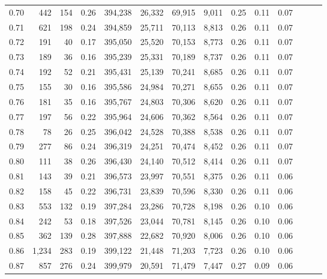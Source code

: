 \begin{tabular}{rrrrrrrrrrrrrr}
0.70 &     442 &    154 &  0.26 &  394,238 &   26,332 &  69,915 &   9,011 &  0.25 &  0.11 &      0.07 \\
0.71 &     621 &    198 &  0.24 &  394,859 &   25,711 &  70,113 &   8,813 &  0.26 &  0.11 &      0.07 \\
0.72 &     191 &     40 &  0.17 &  395,050 &   25,520 &  70,153 &   8,773 &  0.26 &  0.11 &      0.07 \\
0.73 &     189 &     36 &  0.16 &  395,239 &   25,331 &  70,189 &   8,737 &  0.26 &  0.11 &      0.07 \\
0.74 &     192 &     52 &  0.21 &  395,431 &   25,139 &  70,241 &   8,685 &  0.26 &  0.11 &      0.07 \\
0.75 &     155 &     30 &  0.16 &  395,586 &   24,984 &  70,271 &   8,655 &  0.26 &  0.11 &      0.07 \\
0.76 &     181 &     35 &  0.16 &  395,767 &   24,803 &  70,306 &   8,620 &  0.26 &  0.11 &      0.07 \\
0.77 &     197 &     56 &  0.22 &  395,964 &   24,606 &  70,362 &   8,564 &  0.26 &  0.11 &      0.07 \\
0.78 &      78 &     26 &  0.25 &  396,042 &   24,528 &  70,388 &   8,538 &  0.26 &  0.11 &      0.07 \\
0.79 &     277 &     86 &  0.24 &  396,319 &   24,251 &  70,474 &   8,452 &  0.26 &  0.11 &      0.07 \\
0.80 &     111 &     38 &  0.26 &  396,430 &   24,140 &  70,512 &   8,414 &  0.26 &  0.11 &      0.07 \\
0.81 &     143 &     39 &  0.21 &  396,573 &   23,997 &  70,551 &   8,375 &  0.26 &  0.11 &      0.06 \\
0.82 &     158 &     45 &  0.22 &  396,731 &   23,839 &  70,596 &   8,330 &  0.26 &  0.11 &      0.06 \\
0.83 &     553 &    132 &  0.19 &  397,284 &   23,286 &  70,728 &   8,198 &  0.26 &  0.10 &      0.06 \\
0.84 &     242 &     53 &  0.18 &  397,526 &   23,044 &  70,781 &   8,145 &  0.26 &  0.10 &      0.06 \\
0.85 &     362 &    139 &  0.28 &  397,888 &   22,682 &  70,920 &   8,006 &  0.26 &  0.10 &      0.06 \\
0.86 &   1,234 &    283 &  0.19 &  399,122 &   21,448 &  71,203 &   7,723 &  0.26 &  0.10 &      0.06 \\
0.87 &     857 &    276 &  0.24 &  399,979 &   20,591 &  71,479 &   7,447 &  0.27 &  0.09 &      0.06 \\

\end{tabular}
